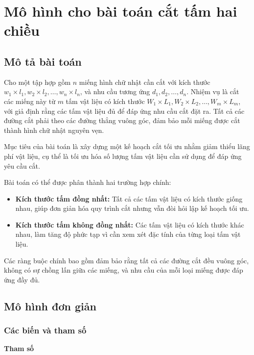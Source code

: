\section{Mô hình cho bài toán cắt tấm hai chiều}
\subsection{Mô tả bài toán}

\hspace{0.5cm} Cho một tập hợp gồm \( n \) miếng hình chữ nhật cần cắt với kích thước \( w_1 \times l_1, w_2 \times l_2, \dots, w_n \times l_n \), và nhu cầu tương ứng \( d_1, d_2, \dots, d_n \). Nhiệm vụ là cắt các miếng này từ \( m \) tấm vật liệu có kích thước \( W_1 \times L_1, W_2 \times L_2, \dots, W_m \times L_m \), với giả định rằng các tấm vật liệu đủ để đáp ứng nhu cầu cắt đặt ra. Tất cả các đường cắt phải theo các đường thẳng vuông góc, đảm bảo mỗi miếng được cắt thành hình chữ nhật nguyên vẹn.

Mục tiêu của bài toán là xây dựng một kế hoạch cắt tối ưu nhằm giảm thiểu lãng phí vật liệu, cụ thể là tối ưu hóa số lượng tấm vật liệu cần sử dụng để đáp ứng yêu cầu cắt.

Bài toán có thể được phân thành hai trường hợp chính:
\begin{itemize}
    \item \textbf{Kích thước tấm đồng nhất:} Tất cả các tấm vật liệu có kích thước giống nhau, giúp đơn giản hóa quy trình cắt nhưng vẫn đòi hỏi lập kế hoạch tối ưu.
    \item \textbf{Kích thước tấm không đồng nhất:} Các tấm vật liệu có kích thước khác nhau, làm tăng độ phức tạp vì cần xem xét đặc tính của từng loại tấm vật liệu.
\end{itemize}

Các ràng buộc chính bao gồm đảm bảo rằng tất cả các đường cắt đều vuông góc, không có sự chồng lấn giữa các miếng, và nhu cầu của mỗi loại miếng được đáp ứng đầy đủ.

\subsection{Mô hình đơn giản}
\subsubsection{Các biến và tham số}

\textbf{Tham số}

